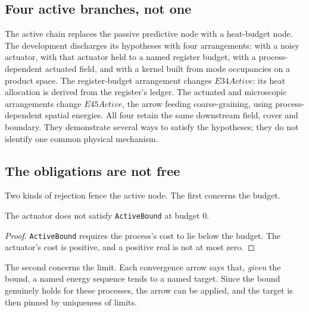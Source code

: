 \subsection{Four active branches, not one}
The active chain replaces the passive predictive node with a heat-budget node.
The development discharges its hypotheses with four arrangements: with a noisy
actuator, with that actuator held to a named
register budget, with a process-dependent actuated field, and with a kernel
built from mode occupancies on a product space.
\scope The register-budget arrangement changes $E34Active$: its heat allocation
is derived from the register's ledger. The actuated and microscopic arrangements
change $E45Active$, the arrow feeding coarse-graining, using process-dependent
spatial energies. All four retain the same downstream field, cover and boundary.
They demonstrate several ways to satisfy the hypotheses; they do not identify
one common physical mechanism.

\subsection{The obligations are not free}
Two kinds of rejection fence the active node. The first concerns the budget.

\begin{claim}
The actuator does not satisfy \texttt{ActiveBound} at budget $0$.
\end{claim}
\begin{proof}
\texttt{ActiveBound} requires the process's cost to lie below the budget. The
actuator's cost is positive, and a positive real is not at most zero.
\end{proof}

The second concerns the limit. Each convergence arrow says that, \emph{given}
the bound, a named energy sequence tends to a named target. Since the bound
genuinely holds for these processes, the arrow can be applied, and the target is
then pinned by uniqueness of limits.

